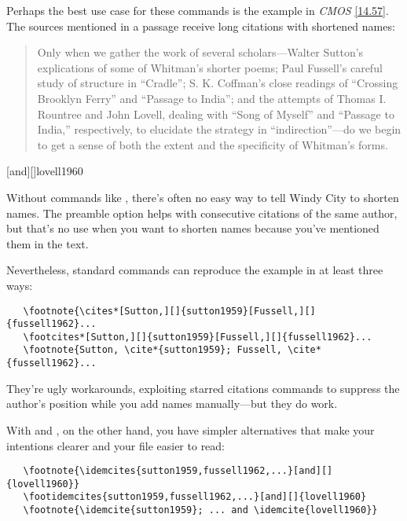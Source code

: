 \documentclass[11pt,letterpaper,oneside]{article}
\begin{document}
Perhaps the best use case for these commands is the example in
\textit{CMOS} \ref{14.57}. The sources mentioned in a passage receive
long citations with shortened names:

\begin{quote} Only when we gather the work of several
scholars---Walter Sutton's explications of some of Whitman's shorter
poems; Paul Fussell's careful study of structure in ``Cradle''; S. K.
Coffman's close readings of ``Crossing Brooklyn Ferry'' and ``Passage
to India''; and the attempts of Thomas I. Rountree and John Lovell,
dealing with ``Song of Myself'' and ``Passage to India,''
respectively, to elucidate the strategy in ``indirection''---do we
begin to get a sense of both the extent and the specificity of
Whitman's forms.\footnotemark[1] \end{quote}

\begin{citeonly}
\item {}[and][]{lovell1960}
\end{citeonly}

Without commands like , there's often no easy way to
tell Windy City to shorten names. The preamble option
 helps with consecutive citations of the same author,
but that's no use when you want to shorten names because you've
mentioned them in the text.

Nevertheless, standard commands can reproduce the example in at least
three ways:

\begin{verbatim}
   \footnote{\cites*[Sutton,][]{sutton1959}[Fussell,][]{fussell1962}...
   \footcites*[Sutton,][]{sutton1959}[Fussell,][]{fussell1962}...
   \footnote{Sutton, \cite*{sutton1959}; Fussell, \cite*{fussell1962}...
\end{verbatim}

\noindent They're ugly workarounds, exploiting starred citations
commands to suppress the author's position while you add names
manually---but they do work.

With  and , on the other hand, you
have simpler alternatives that make your intentions clearer and your
file easier to read:

\begin{verbatim}
   \footnote{\idemcites{sutton1959,fussell1962,...}[and][]{lovell1960}}
   \footidemcites{sutton1959,fussell1962,...}[and][]{lovell1960}
   \footnote{\idemcite{sutton1959}; ... and \idemcite{lovell1960}}
\end{verbatim}
\end{document}
